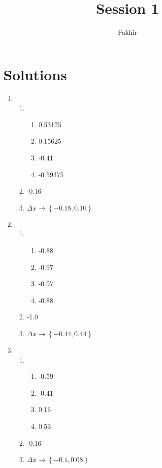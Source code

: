 \documentclass[]{article}
\title{Session 1}
\author{Fakhir}
\begin{document}
\maketitle

\section*{Solutions}

\begin{enumerate}
	\item \begin{enumerate}
		\item  \begin{enumerate}
			\item 0.53125
			\item 0.15625
			\item -0.41
			\item -0.59375
			\end{enumerate}
		\item -0.16
		\item $\Delta x \rightarrow \left\lbrace -0.18, 0.10\right\rbrace $
		\end{enumerate}

	\item \begin{enumerate}
		\item  \begin{enumerate}
			\item -0.88
			\item -0.97
			\item -0.97
			\item -0.88
			\end{enumerate}
		\item -1.0
		\item $\Delta x \rightarrow \left\lbrace -0.44,0.44\right\rbrace $
		\end{enumerate}
	
	\item \begin{enumerate}
		\item  \begin{enumerate}
			\item -0.59
			\item -0.41
			\item 0.16
			\item 0.53
		\end{enumerate}
		\item -0.16
		\item $\Delta x \rightarrow \left\lbrace -0.1,0.08\right\rbrace $
	\end{enumerate}
	

\end{enumerate}
\end{document}
